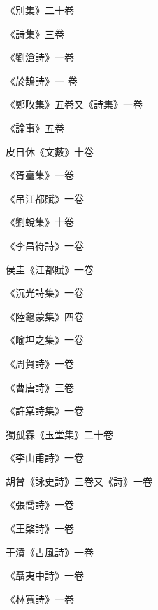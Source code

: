 \begin{pinyinscope}
 《別集》二十卷



 《詩集》三卷



 《劉滄詩》一卷



 《於鵠詩》一
 卷



 《鄭畋集》五卷又《詩集》一卷



 《論事》五卷



 皮日休《文藪》十卷



 《胥臺集》一卷



 《吊江都賦》一卷



 《劉蛻集》十卷



 《李昌符詩》一卷



 侯圭《江都賦》一卷



 《沉光詩集》一卷



 《陸龜蒙集》四卷



 《喻坦之集》一卷



 《周賀詩》一卷



 《曹唐詩》三卷



 《許棠詩集》一卷



 獨孤霖《玉堂集》二十卷



 《李山甫詩》一卷



 胡曾《詠史詩》三卷又《詩》一卷



 《張喬詩》一卷



 《王棨詩》一卷



 于濆《古風詩》一卷



 《聶夷中詩》一卷



 《林寬詩》一卷




\end{pinyinscope}

